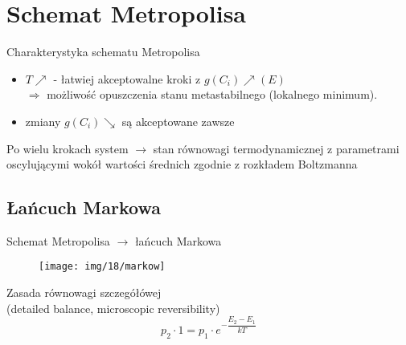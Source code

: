 \section{Schemat Metropolisa}




%		
		
		
		
		

	
	\begin{frame}{Charakterystyka schematu Metropolisa}
		\begin{itemize}
			\item $T \nearrow$ - łatwiej akceptowalne kroki z $g(C_i) \nearrow (E)$ \\ $ \Rightarrow$ możliwość opuszczenia stanu metastabilnego (lokalnego minimum).
			\item zmiany $g(C_i) \searrow$ są akceptowane zawsze
		\end{itemize}
		
		Po wielu krokach system $\rightarrow$ stan równowagi termodynamicznej z parametrami oscylującymi wokół wartości średnich zgodnie z rozkładem Boltzmanna 
		

	\end{frame}

\subsection{Łańcuch Markowa}
	
	\begin{frame}{Schemat Metropolisa $\rightarrow$ łańcuch Markowa}
		\begin{figure}
				\texttt{[image: img/18/markow]}
		\end{figure}
		\begin{block}{Zasada równowagi szczegółówej\\ 
		(detailed balance, microscopic reversibility)}
			$$
			p_2 \cdot 1 = p_1 \cdot e^{- \dfrac{E_2 - E_1}{kT}}
			$$
		\end{block}
	\end{frame}

